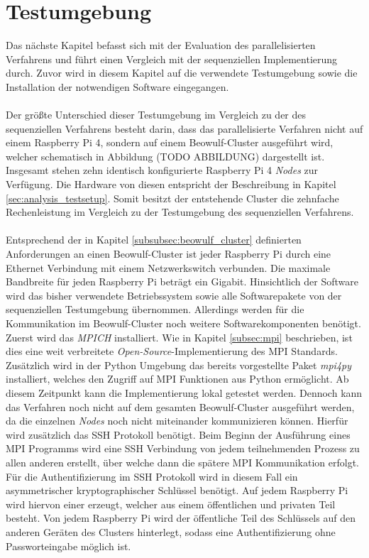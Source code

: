 \section{Testumgebung} %
\label{sec:test_env_parallel}
Das nächste Kapitel befasst sich mit der Evaluation des parallelisierten Verfahrens und führt einen Vergleich mit der sequenziellen Implementierung durch. Zuvor wird in diesem Kapitel auf die verwendete Testumgebung sowie die Installation der notwendigen Software eingegangen. 
\\\\
Der größte Unterschied dieser Testumgebung im Vergleich zu der des sequenziellen Verfahrens besteht darin, dass das parallelisierte Verfahren nicht auf einem Raspberry Pi 4, sondern auf einem Beowulf-Cluster ausgeführt wird, welcher schematisch in Abbildung (TODO ABBILDUNG) dargestellt ist. Insgesamt stehen zehn identisch konfigurierte Raspberry Pi 4 \emph{Nodes} zur Verfügung. Die Hardware von diesen entspricht der Beschreibung in Kapitel \ref{sec:analysis_testsetup}. Somit besitzt der entstehende Cluster die zehnfache Rechenleistung im Vergleich zu der Testumgebung des sequenziellen Verfahrens.
\\\\
Entsprechend  der in Kapitel \ref{subsubsec:beowulf_cluster} definierten Anforderungen an einen Beowulf-Cluster ist jeder Raspberry Pi durch eine Ethernet Verbindung mit einem Netzwerkswitch verbunden. Die maximale Bandbreite für jeden Raspberry Pi beträgt ein Gigabit. Hinsichtlich der Software wird das bisher verwendete Betriebssystem sowie alle Softwarepakete von der sequenziellen Testumgebung übernommen. Allerdings werden für die Kommunikation im Beowulf-Cluster noch weitere Softwarekomponenten benötigt. Zuerst wird das \emph{MPICH} installiert. Wie in Kapitel \ref{subsec:mpi} beschrieben, ist dies eine weit verbreitete \emph{Open-Source}-Implementierung des \ac{MPI} Standards. Zusätzlich wird in der Python Umgebung das bereits vorgestellte Paket \emph{mpi4py} installiert, welches den Zugriff auf \ac{MPI} Funktionen aus Python ermöglicht. Ab diesem Zeitpunkt kann die Implementierung lokal getestet werden. Dennoch kann das Verfahren noch nicht auf dem gesamten Beowulf-Cluster ausgeführt werden, da die einzelnen \emph{Nodes} noch nicht miteinander kommunizieren können. Hierfür wird zusätzlich das \ac{SSH} Protokoll benötigt. Beim Beginn der Ausführung eines \ac{MPI} Programms wird eine \ac{SSH} Verbindung von jedem teilnehmenden Prozess zu allen anderen erstellt, über welche dann die spätere \ac{MPI} Kommunikation erfolgt. Für die Authentifizierung im \ac{SSH} Protokoll wird in diesem Fall ein asymmetrischer kryptographischer Schlüssel benötigt. Auf jedem Raspberry Pi wird hiervon einer erzeugt, welcher aus einem öffentlichen und privaten Teil besteht. Von jedem Raspberry Pi wird der öffentliche Teil des Schlüssels auf den anderen Geräten des Clusters hinterlegt, sodass eine Authentifizierung ohne Passworteingabe möglich ist.
